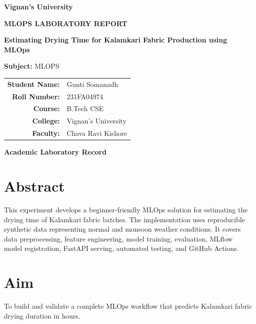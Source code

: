 \documentclass[12pt,a4paper]{article}
\begin{document}
\begin{titlepage}
\begin{center}
    \vspace*{1.2cm}
    {\Large \textbf{Vignan's University}\par}
    \vspace{1.5cm}
    {\LARGE \textbf{MLOPS LABORATORY REPORT}\par}
    \vspace{1.2cm}
    {\Huge \textbf{Estimating Drying Time for Kalamkari Fabric Production using MLOps}\par}
    \vspace{1.5cm}
    {\large \textbf{Subject:} MLOPS\par}
    \vspace{1.5cm}
    \begin{tabular}{>{\bfseries}rl}
        Student Name: & Gunti Somanadh \\
        Roll Number: & 231FA04974 \\
        Course: & B.Tech CSE \\
        College: & Vignan's University \\
        Faculty: & Chava Ravi Kishore
    \end{tabular}
    \vfill
    {\large \textbf{Academic Laboratory Record}\par}
\end{center}
\end{titlepage}

\setcounter{page}{2}
\section*{Abstract}
This experiment develops a beginner-friendly MLOps solution for estimating the drying time of Kalamkari fabric batches. The implementation uses reproducible synthetic data representing normal and monsoon weather conditions. It covers data preprocessing, feature engineering, model training, evaluation, MLflow model registration, FastAPI serving, automated testing, and GitHub Actions.

\section*{Aim}
To build and validate a complete MLOps workflow that predicts Kalamkari fabric drying duration in hours.
\end{document}
